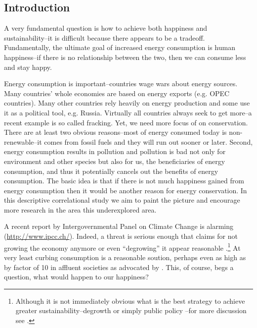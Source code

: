 \documentclass[10pt, letterpaper]{article}
\begin{document}
\begin{spacing}{1.4}



\section{Introduction}

A very fundamental question is how to achieve both happiness and
sustainability--it is difficult because there appears to be a tradeoff.
Fundamentally,
 the ultimate goal of increased energy consumption is human
 happiness--if there is no relationship between the two, then we can
 consume less and stay happy.

Energy consumption is important--countries wage wars about energy sources. Many
countries' whole economies are based on energy exports (e.g. OPEC
countries). Many other countries rely heavily on energy production and some use
it as a political tool, e.g. Russia. 
Virtually all countries  always seek to get more--a recent example is so called
fracking. Yet, we need more focus of on conservation. There are at least two
obvious reasons--most of energy consumed today is non-renewable--it comes from
fossil fuels and they will run out sooner or later. %
Second, energy consumption results in pollution and pollution is bad not only
for environment and other species but also for us, the beneficiaries of energy
consumption, and thus it potentially cancels out the benefits of energy
consumption. The basic idea is that if there is not much happiness gained from
energy consumption then it would be another reason for energy
conservation. 
In this descriptive correlational study we aim to paint the picture and
encourage more research in the area this underexplored area.

A recent report by
Intergovernmental Panel on Climate Change is alarming 
(\url{http://www.ipcc.ch/}). Indeed, a threat is serious enough that
claims for not growing the economy anymore or even ``degrowing'' it
appear reasonable \citep{kallis12}.\footnote{Although it is not
  immediately obvious what is the best strategy to achieve greater
  sustainability--degrowth \citep{kallis11} or simply public policy
  \citep{bergh11}--for more discussion see \citet{daly13,kallis12}.} At very
least curbing consumption is a reasonable soution, perhaps even as high as by
factor of 10 in affluent societies  as advocated by \citet{pretty13}. This,
of course, begs a question, what would happen to our happiness?



\end{spacing}
\end{document}
